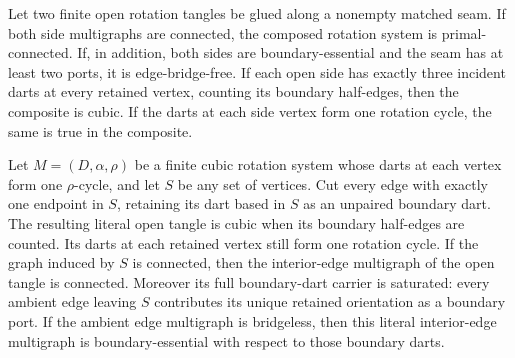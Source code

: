 \begin{theorem}
\label{thm:implemented-seam-composite-fields}
Let two finite open rotation tangles be glued along a nonempty matched seam.
If both side multigraphs are connected, the composed rotation system is
primal-connected.
If, in addition, both sides are boundary-essential and the seam has at least
two ports, it is edge-bridge-free.
If each open side has exactly three incident darts at every retained vertex,
counting its boundary half-edges, then the composite is cubic.
If the darts at each side vertex form one rotation cycle, the same is true in
the composite.
\end{theorem}

\begin{lemma}
\label{lem:vertex-shore-local-structure}
Let \(M=(D,\alpha,\rho)\) be a finite cubic rotation system whose darts at
each vertex form one \(\rho\)-cycle, and let \(S\) be any set of vertices.
Cut every edge with exactly one endpoint in \(S\), retaining its dart based
in \(S\) as an unpaired boundary dart.  The resulting literal open tangle is
cubic when its boundary half-edges are counted.
Its darts at each retained vertex still form one rotation cycle.
If the graph induced by \(S\) is connected, then the interior-edge
multigraph of the open tangle is connected.
Moreover its full boundary-dart carrier is saturated: every ambient edge
leaving \(S\) contributes its unique retained orientation as a boundary
port.
If the ambient edge multigraph is bridgeless, then this literal interior-edge
multigraph is boundary-essential with respect to those boundary darts.
\end{lemma}

